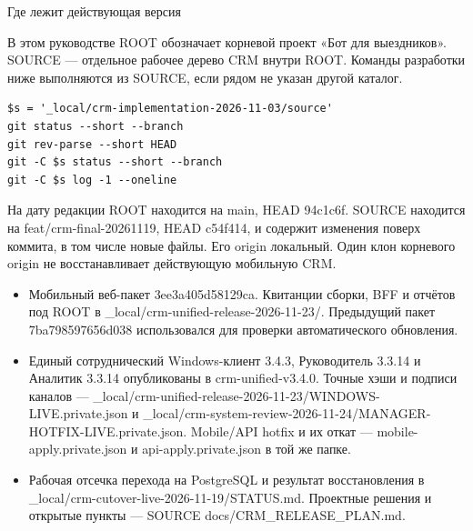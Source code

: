 \documentclass[12pt,a4paper]{article}
\newcommand{\chapterhead}[1]{{\fontsize{23}{27}\selectfont #1\par}\vspace{5pt}}
\newcommand{\subhead}[1]{\par\vspace{4pt}{\large\sffamily\bfseries\color{accent}#1\par}\nopagebreak}
\begin{document}
\clearpage
{}
\label{ch3}\chapterhead{Где лежит действующая версия}
В этом руководстве ROOT обозначает корневой проект «Бот для выездников». SOURCE — отдельное рабочее дерево CRM внутри ROOT. Команды разработки ниже выполняются из SOURCE, если рядом не указан другой каталог.\par
{\footnotesize\begin{verbatim}
$s = '_local/crm-implementation-2026-11-03/source'
git status --short --branch
git rev-parse --short HEAD
git -C $s status --short --branch
git -C $s log -1 --oneline
\end{verbatim}}
На дату редакции ROOT находится на {\small\ttfamily main}, HEAD {\small\ttfamily 94c1c6f}. SOURCE находится на {\small\ttfamily feat/\allowbreak{}crm-\allowbreak{}final-\allowbreak{}20261119}, HEAD {\small\ttfamily c54f414}, и содержит изменения поверх коммита, в том числе новые файлы. Его origin локальный. Один клон корневого origin не восстанавливает действующую мобильную CRM.\par
\subhead{С чем сверять выпуск}
\begin{itemize}
\item Мобильный веб-пакет {\small\ttfamily 3ee3a405d58129ca}. Квитанции сборки, BFF и отчётов под ROOT в {\small\ttfamily \_\allowbreak{}local/\allowbreak{}crm-\allowbreak{}unified-\allowbreak{}release-\allowbreak{}2026-\allowbreak{}11-\allowbreak{}23/\allowbreak{}}. Предыдущий пакет {\small\ttfamily 7ba798597656d038} использовался для проверки автоматического обновления.
\item Единый сотруднический Windows-клиент 3.4.3, Руководитель 3.3.14 и Аналитик 3.3.14 опубликованы в {\small\ttfamily crm-\allowbreak{}unified-\allowbreak{}v3.\allowbreak{}4.\allowbreak{}0}. Точные хэши и подписи каналов — {\small\ttfamily \_\allowbreak{}local/\allowbreak{}crm-\allowbreak{}unified-\allowbreak{}release-\allowbreak{}2026-\allowbreak{}11-\allowbreak{}23/\allowbreak{}WINDOWS-\allowbreak{}LIVE.\allowbreak{}private.\allowbreak{}json} и {\small\ttfamily \_\allowbreak{}local/\allowbreak{}crm-\allowbreak{}system-\allowbreak{}review-\allowbreak{}2026-\allowbreak{}11-\allowbreak{}24/\allowbreak{}MANAGER-\allowbreak{}HOTFIX-\allowbreak{}LIVE.\allowbreak{}private.\allowbreak{}json}. Mobile/API hotfix и их откат — {\small\ttfamily mobile-\allowbreak{}apply.\allowbreak{}private.\allowbreak{}json} и {\small\ttfamily api-\allowbreak{}apply.\allowbreak{}private.\allowbreak{}json} в той же папке.
\item Рабочая отсечка перехода на PostgreSQL и результат восстановления в {\small\ttfamily \_\allowbreak{}local/\allowbreak{}crm-\allowbreak{}cutover-\allowbreak{}live-\allowbreak{}2026-\allowbreak{}11-\allowbreak{}19/\allowbreak{}STATUS.\allowbreak{}md}. Проектные решения и открытые пункты — SOURCE {\small\ttfamily docs/\allowbreak{}CRM\_\allowbreak{}RELEASE\_\allowbreak{}PLAN.\allowbreak{}md}.
\end{itemize}
\end{document}
